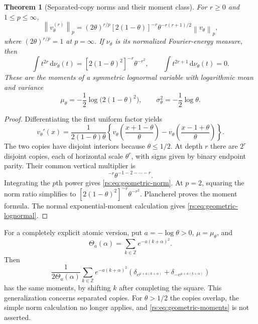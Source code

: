 \documentclass[11pt,a4paper,oneside,openany]{book}
\numberwithin{equation}{chapter}
\newtheorem{theorem}{Theorem}[chapter]
\theoremstyle{definition}
\theoremstyle{remark}
\newcommand{\Z}{\mathbb Z}
\newcommand{\dd}{\,\mathrm d}
\newcommand{\norm}[1]{\left\lVert #1\right\rVert}
\begin{document}
\begin{theorem}[Separated-copy norms and their moment class]\label{rs:thm:geometric}
For $r\geq0$ and $1\leq p\leq\infty$,
\begin{equation}
 \norm{v_\theta^{(r)}}_p
 =(2\theta)^{r/p}[2(1-\theta)]^{-r}
       \theta^{-r(r+1)/2}\norm{v_\theta}_p,
 \label{rs:eq:geometric-norm}
\end{equation}
where $(2\theta)^{r/p}=1$ at $p=\infty$.
If $\nu_\theta$ is its normalized Fourier-energy measure, then
\begin{equation}
 \int t^{2r}\dd\nu_\theta(t)
 =[2(1-\theta)^2]^{-r}\theta^{-r^2},
 \qquad \int t^{2r+1}\dd\nu_\theta(t)=0.
 \label{rs:eq:geometric-moments}
\end{equation}
These are the moments of a symmetric lognormal variable with
logarithmic mean and variance
\begin{equation}
 \mu_\theta=-\frac12\log\bigl(2(1-\theta)^2\bigr),
 \qquad \sigma_\theta^2=-\frac12\log\theta.
 \label{rs:eq:geometric-lognormal}
\end{equation}
\end{theorem}
\begin{proof}
Differentiating the first uniform factor yields
\begin{equation}
 v_\theta'(x)=\frac1{2(1-\theta)\theta}
 \left\{v_\theta\left(\frac{x+1-\theta}{\theta}\right)
       -v_\theta\left(\frac{x-1+\theta}{\theta}\right)\right\}.
 \label{rs:eq:geometric-refinement}
\end{equation}
The two copies have disjoint interiors because $\theta\leq1/2$.
At depth $r$ there are $2^r$ disjoint copies, each of horizontal
scale $\theta^r$, with signs given by binary endpoint parity.
Their common vertical multiplier is
\begin{equation}
 [2(1-\theta)]^{-r}\theta^{-1-2-\cdots-r}.
\end{equation}
Integrating the $p$th power gives \eqref{rs:eq:geometric-norm}.
At $p=2$, squaring the norm ratio simplifies to
$[2(1-\theta)^2]^{-r}\theta^{-r^2}$. Plancherel proves the
moment formula. The normal exponential-moment calculation gives
\eqref{rs:eq:geometric-lognormal}.
\end{proof}

For a completely explicit atomic version, put $a=-\log\theta>0$,
$\mu=\mu_\theta$, and
\begin{equation}
 \Theta_a(\alpha)=\sum_{k\in\Z}e^{-a(k+\alpha)^2}.
\end{equation}
Then
\begin{equation}
 \frac1{2\Theta_a(\alpha)}\sum_{k\in\Z}e^{-a(k+\alpha)^2}
 \left(\delta_{e^{\mu+a(k+\alpha)}}+
       \delta_{-e^{\mu+a(k+\alpha)}}\right)
 \label{rs:eq:general-atomic}
\end{equation}
has the same moments, by shifting $k$ after completing the square.
This generalization concerns separated copies. For $\theta>1/2$
the copies overlap, the simple norm calculation no longer applies,
and \eqref{rs:eq:geometric-moments} is not asserted.
\end{document}
